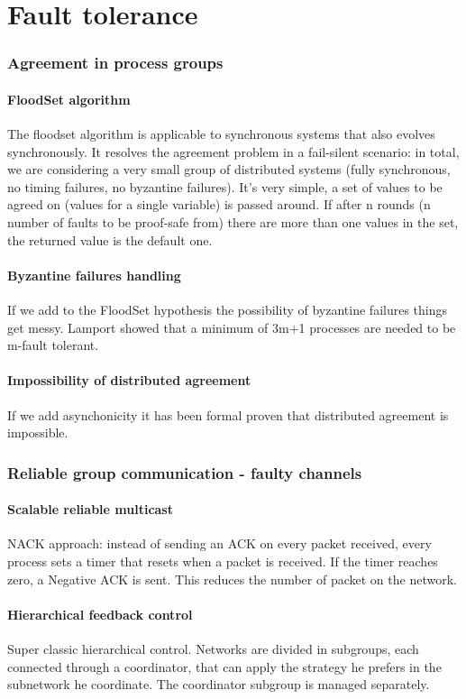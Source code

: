 \documentclass[10pt,a4paper]{article}
\begin{document}
	\part{Fault tolerance}
		\section{Agreement in process groups}		
			\subsection{FloodSet algorithm}
				The floodset algorithm is applicable to synchronous systems that also evolves synchronously. It resolves the agreement problem in a fail-silent scenario: in total, we are considering a very small group of distributed systems (fully synchronous, no timing failures, no byzantine failures). It's very simple, a set of values to be agreed on (values for a single variable) is passed around. If after n rounds (n number of faults to be proof-safe from) there are more than one values in the set, the returned value is the default one. 
			\subsection{Byzantine failures handling}
				If we add to the FloodSet hypothesis the possibility of byzantine failures things get messy. Lamport showed that a minimum of 3m+1 processes are needed to be m-fault tolerant.
			\subsection{Impossibility of distributed agreement}
				If we add asynchonicity it has been formal proven that distributed agreement is impossible.
				
		\section{Reliable group communication - faulty channels}
			\subsection{Scalable reliable multicast}
				NACK approach: instead of sending an ACK on every packet received, every process sets a timer that resets when a packet is received. If the timer reaches zero, a Negative ACK is sent. This reduces the number of packet on the network. 
			\subsection{Hierarchical feedback control}
				Super classic hierarchical control. Networks are divided in subgroups, each connected through a coordinator, that can apply the strategy he prefers in the subnetwork he coordinate. The coordinator subgroup is managed separately.
				
\end{document}
